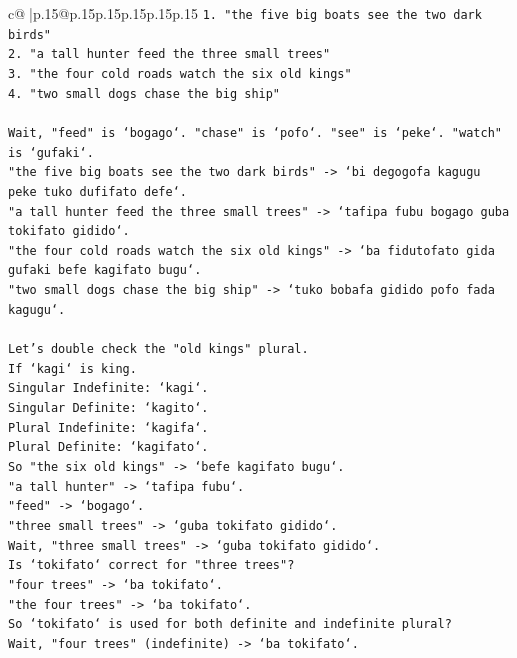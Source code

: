 \documentclass{article}
\begin{document}
{\begin{supertabular}{c@{$\;$}|p{.15\linewidth}@{}p{.15\linewidth}p{.15\linewidth}p{.15\linewidth}p{.15\linewidth}p{.15\linewidth}}
{{{\texttt{1. "the five big boats see the two dark birds"} \\
\texttt{2. "a tall hunter feed the three small trees"} \\
\texttt{3. "the four cold roads watch the six old kings"} \\
\texttt{4. "two small dogs chase the big ship"} \\
\\ 
\texttt{Wait, "feed" is `bogago`. "chase" is `pofo`. "see" is `peke`. "watch" is `gufaki`.} \\
\texttt{"the five big boats see the two dark birds" {-}> `bi degogofa kagugu peke tuko dufifato defe`.} \\
\texttt{"a tall hunter feed the three small trees" {-}> `tafipa fubu bogago guba tokifato gidido`.} \\
\texttt{"the four cold roads watch the six old kings" {-}> `ba fidutofato gida gufaki befe kagifato bugu`.} \\
\texttt{"two small dogs chase the big ship" {-}> `tuko bobafa gidido pofo fada kagugu`.} \\
\\ 
\texttt{Let's double check the "old kings" plural.} \\
\texttt{If `kagi` is king.} \\
\texttt{Singular Indefinite: `kagi`.} \\
\texttt{Singular Definite: `kagito`.} \\
\texttt{Plural Indefinite: `kagifa`.} \\
\texttt{Plural Definite: `kagifato`.} \\
\texttt{So "the six old kings" {-}> `befe kagifato bugu`.} \\
\texttt{"a tall hunter" {-}> `tafipa fubu`.} \\
\texttt{"feed" {-}> `bogago`.} \\
\texttt{"three small trees" {-}> `guba tokifato gidido`.} \\
\texttt{Wait, "three small trees" {-}> `guba tokifato gidido`.} \\
\texttt{Is `tokifato` correct for "three trees"?} \\
\texttt{"four trees" {-}> `ba tokifato`.} \\
\texttt{"the four trees" {-}> `ba tokifato`.} \\
\texttt{So `tokifato` is used for both definite and indefinite plural?} \\
\texttt{Wait, "four trees" (indefinite) {-}> `ba tokifato`.} \\
}}}
\end{supertabular}}
\end{document}
